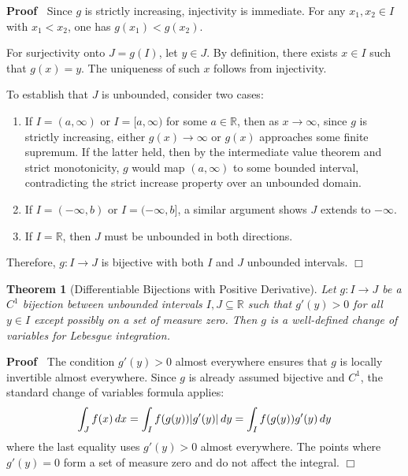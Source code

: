 \documentclass{article}
\newenvironment{proof}{\noindent\textbf{Proof\ }}{\hspace*{\fill}$\Box$\medskip}
\newtheorem{theorem}{Theorem}
\begin{document}
\begin{proof}
  Since $g$ is strictly increasing, injectivity is immediate. For any $x_1,
  x_2 \in I$ with $x_1 < x_2$, one has $g (x_1) < g (x_2)$.
  
  For surjectivity onto $J = g (I)$, let $y \in J$. By definition, there
  exists $x \in I$ such that $g (x) = y$. The uniqueness of such $x$ follows
  from injectivity.
  
  To establish that $J$ is unbounded, consider two cases:
  \begin{enumerate}
    \item If $I = (a, \infty)$ or $I = [a, \infty)$ for some $a \in
    \mathbb{R}$, then as $x \to \infty$, since $g$ is strictly increasing,
    either $g (x) \to \infty$ or $g (x)$ approaches some finite supremum. If
    the latter held, then by the intermediate value theorem and strict
    monotonicity, $g$ would map $(a, \infty)$ to some bounded interval,
    contradicting the strict increase property over an unbounded domain.
    
    \item If $I = (- \infty, b)$ or $I = (- \infty, b]$, a similar argument
    shows $J$ extends to $- \infty$.
    
    \item If $I =\mathbb{R}$, then $J$ must be unbounded in both directions.
  \end{enumerate}
  Therefore, $g : I \to J$ is bijective with both $I$ and $J$ unbounded
  intervals.
\end{proof}

\begin{theorem}
  [Differentiable Bijections with Positive
  Derivative]\label{thm:diff_bijective}Let $g : I \to J$ be a $C^1$ bijection
  between unbounded intervals $I, J \subseteq \mathbb{R}$ such that $g' (y) >
  0$ for all $y \in I$ except possibly on a set of measure zero. Then $g$ is a
  well-defined change of variables for Lebesgue integration.
\end{theorem}

\begin{proof}
  The condition $g' (y) > 0$ almost everywhere ensures that $g$ is locally
  invertible almost everywhere. Since $g$ is already assumed bijective and
  $C^1$, the standard change of variables formula applies:
  \begin{equation}
    \label{eq:change_vars} \int_J f (x)  \hspace{0.17em} dx = \int_I f (g (y))
    |g' (y) |  \hspace{0.17em} dy = \int_I f (g (y)) g' (y)  \hspace{0.17em}
    dy
  \end{equation}
  where the last equality uses $g' (y) > 0$ almost everywhere. The points
  where $g' (y) = 0$ form a set of measure zero and do not affect the
  integral.
\end{proof}
\end{document}
